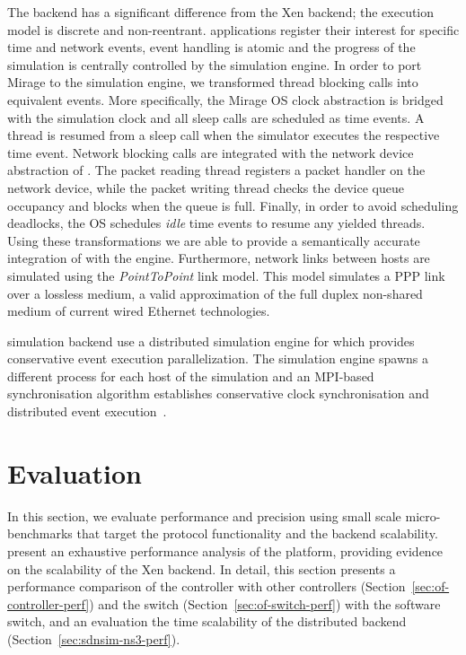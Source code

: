 The  backend has a significant difference from the Xen backend; the
execution model is discrete and non-reentrant.  applications register
their interest for specific time and network events, event handling is atomic
and the progress of the simulation is centrally controlled by the simulation
engine. In order to port Mirage to the  simulation engine, we transformed
thread blocking calls into equivalent  events.  More specifically, the
Mirage OS clock abstraction is bridged with the  simulation clock and all
sleep calls are scheduled as  time events.  A thread is resumed from a
sleep call when the simulator executes the respective time event.  Network
blocking calls are integrated with the network device abstraction of .
The packet reading thread registers a packet handler on the network device,
while the packet writing thread checks the device queue occupancy and blocks
when the queue is full. Finally, in order to avoid scheduling deadlocks, the OS
schedules {\it idle} \/time events to resume any yielded threads. Using these
transformations we are able to provide a semantically accurate integration of
\mirage with the  engine.  Furthermore, network links between hosts are
simulated using the {\it PointToPoint} \/link model. This model simulates a PPP
link over a lossless medium, a valid approximation of the full duplex
non-shared medium of current wired Ethernet technologies.

\sdnsim simulation backend use a distributed simulation engine for  which provides
conservative event execution parallelization. The simulation engine spawns a
different process for each host of the simulation and an MPI-based
synchronisation algorithm establishes conservative clock synchronisation and
distributed event execution~. 


\section{\sdnsim Evaluation} \label{sec:sdnsim-precision}

In this section, we evaluate \sdnsim performance and precision
using small scale micro-benchmarks that target the \of protocol functionality
and the  backend scalability.   present an
exhaustive performance analysis of the \mirage platform, providing evidence on
the scalability of the Xen backend. In detail, this section presents a
performance comparison of the \mirage \of controller with other controllers
(Section~\ref{sec:of-controller-perf}) and the \mirage \of switch
(Section~\ref{sec:of-switch-perf}) with the \ovs software switch,
and an evaluation the time scalability of the distributed  backend
(Section~\ref{sec:sdnsim-ns3-perf}).

